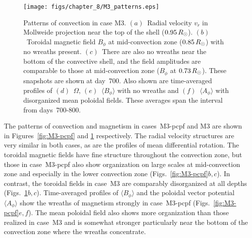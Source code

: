 \begin{figure}
  \begin{center}
    \texttt{[image: figs/chapter\_8/M3\_patterns.eps]}
  \end{center}
  \caption[Patterns of convection in case M3]
	  {Patterns of convection in case M3.  
  $(a)$~Radial velocity $v_r$ in Mollweide projection
  near the top of the shell ($0.95\thinspace R_\odot$).  
  $(b)$~Toroidal magnetic field $B_\phi$ at mid-convection zone
  ($0.85\thinspace R_\odot$) with no wreaths present.
  $(c)$~There are also no wreaths near the bottom of the
  convective shell, and the field amplitudes are comparable to those
  at mid-convection zone ($B_\phi$ at $0.73\thinspace R_\odot$).
  These snapshots are shown at day~700.
  Also shown are time-averaged profiles of $(d)$~$\Omega$, 
  $(e)$~$\langle B_\phi \rangle$ with no wreaths and
  $(f)$~$\langle A_\phi \rangle$	with disorganized mean
  poloidal fields.  These averages span the interval from
  days~700-800. 
  \label{fig:M3}}
\end{figure}


The patterns of convection and magnetism in cases~M3-pcpf and M3 are
shown in Figures~\ref{fig:M3-pcpf} and \ref{fig:M3} respectively.  The
radial velocity structures are very similar in both cases, as are the
profiles of mean differential rotation.  The toroidal magnetic fields
have fine structure throughout the convection zone, but those in
case~M3-pcpf also show organization on large scales at mid-convection
zone and especially in the lower convection zone
(Figs.~\ref{fig:M3-pcpf}$b,c$).  In contrast, the toroidal fields in
case~M3 are comparably disorganized at all depths
(Figs.~\ref{fig:M3}$b,c$).  Time-averaged profiles of $\langle B_\phi
\rangle$ and the poloidal vector potential $\langle A_\phi \rangle$
show the wreaths of magnetism strongly in  case~M3-pcpf
(Figs.~\ref{fig:M3-pcpf}$e,f$).  The mean
poloidal field also shows more organization than those realized in
case~M3 and is somewhat stronger particularly near the bottom of the
convection zone where the wreaths concentrate. 



